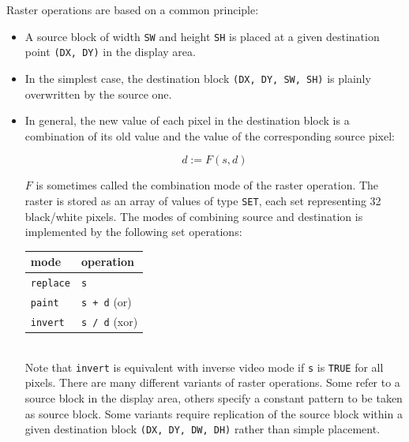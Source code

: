 Raster operations are based on a common principle:
\begin{itemize}
  \item A source block of width \verb|SW| and height \verb|SH| is placed at a given destination point
    \verb|(DX, DY)| in the display area.
  \item In the simplest case, the destination block \verb|(DX, DY, SW, SH)| is plainly overwritten
    by the source one.
  \item In general, the new value of each pixel in the destination block is a combination
    of its old value and the value of the corresponding source pixel:

    \[ d := F(s, d) \]
    
    $F$ is sometimes called the combination mode of the raster operation.  The raster is stored
    as an array of values of type \verb|SET|, each set representing 32 black/white pixels.
    The modes of combining source and destination is implemented by the following set operations:
    \begin{table}[h!]
      \centering
      \begin{tabular}{l l}
        mode           & operation \\\hline
        \verb|replace| & \verb|s| \\
        \verb|paint|   & \verb|s + d| (or) \\
        \verb|invert|  & \verb|s / d| (xor)
      \end{tabular}
    \end{table}
    \\Note that \verb|invert| is equivalent with inverse video mode if \verb|s| is
    \verb|TRUE| for all pixels.  There are many different variants of raster operations.
    Some refer to a source block in the display area, others specify a constant pattern
    to be taken as source block.  Some variants require replication of the source block
    within a given destination block \verb|(DX, DY, DW, DH)| rather than simple placement.
\end{itemize}

